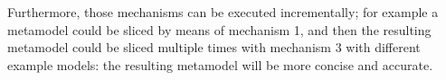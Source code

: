 Furthermore, those mechanisms can be executed incrementally; for example a metamodel could be sliced by means of
mechanism 1, and then the resulting metamodel could be sliced multiple times with mechanism 3 with different example models:
the resulting metamodel will be more concise and accurate.
%
\vspace{-.4cm}
\begin{figure}
  \centering
 \hspace{10mm}

\end{figure}
